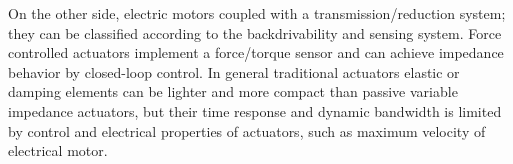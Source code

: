 \par On the other side, \DIFdelbegin {}\DIFdelend {}  \DIFaddend electric motors coupled with a transmission/reduction system; they can be classified
according to the backdrivability and sensing system. Force controlled actuators implement a force/torque sensor
\DIFdelbegin {}\DIFdelend \DIFaddbegin {}\DIFaddend and can achieve impedance behavior by closed-loop control.
In general traditional actuators \DIFdelbegin {}\DIFdelend \DIFaddbegin {}\DIFaddend elastic or damping elements \DIFdelbegin \DIFdel{, }\DIFdelend can be lighter and more compact
than passive variable impedance actuators, but their time response and dynamic bandwidth is limited by control and electrical properties of actuators, such as maximum velocity of electrical motor.
%
%

